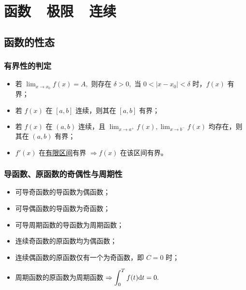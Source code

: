 \chapter{函数~~极限~~连续}

\section{函数的性态}

\subsection{有界性的判定}

\begin{itemize}
    \item 若 $ {\displaystyle\lim_{x\rightarrow x_0}}f(x)=A, $ 则存在 $ \delta>0, $ 当
    $ 0<|x-x_0|<\delta $ 时，$ f(x) $ 有界；
    \item  若 $ f(x) $ 在 $ [a,b] $ 连续，则其在 $ [a,b] $ 有界；
    \item[\important]  若 $ f(x) $ 在 $ (a,b) $ 连续，且 $ {\displaystyle\lim_{x\rightarrow a^+}}f(x),
    {\displaystyle\lim_{x\rightarrow b^-}}f(x) $ 均存在，则其在 $ (a,b) $ 有界；
    \item $ f'(x) $ 在\underline{有限区间}有界 $ \Rightarrow f(x) $ 在该区间有界。
\end{itemize}

\subsection{导函数、原函数的奇偶性与周期性}


\begin{itemize}
    \item 可导奇函数的导函数为偶函数；
    \item 可导偶函数的导函数为奇函数；
    \item 可导周期函数的导函数为周期函数；
\end{itemize}


\begin{itemize}
    \item 连续奇函数的原函数均为偶函数；
    \item 连续偶函数的原函数仅有一个为奇函数，即 $ C = 0 $ 时；
    \item 周期函数的原函数为周期函数 $ \Rightarrow \displaystyle \int_0^T f(t)\mathrm{d}t = 0. $ 
\end{itemize}

